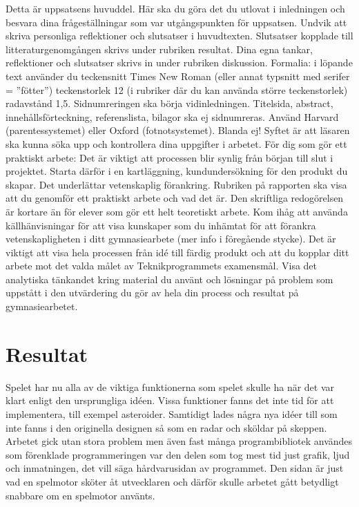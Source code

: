 \documentclass[12pt, a4paper]{article}
\begin{document}
	\begin{small}
		Detta är uppsatsens huvuddel. Här ska du göra det du utlovat i inledningen och
besvara dina frågeställningar som var utgångspunkten för uppsatsen. Undvik
att skriva personliga reflektioner och slutsatser i huvudtexten. Slutsatser
kopplade till litteraturgenomgången skrivs under rubriken resultat. Dina egna
tankar, reflektioner och slutsatser skrivs in under rubriken diskussion.
Formalia: i löpande text använder du teckensnitt Times New Roman (eller
annat typsnitt med serifer = ”fötter”) teckenstorlek 12 (i rubriker där du kan
använda större teckenstorlek) radavstånd 1,5. Sidnumreringen ska börja vidinledningen. Titelsida, abstract, innehållsförteckning, referenslista, bilagor ska
ej sidnumreras. Använd Harvard (parentessystemet) eller Oxford
(fotnotsystemet). Blanda ej! Syftet är att läsaren ska kunna söka upp och
kontrollera dina uppgifter i arbetet.
För dig som gör ett praktiskt arbete:
Det är viktigt att processen blir synlig från början till slut i projektet. Starta
därför i en kartläggning, kundundersökning för den produkt du skapar. Det
underlättar vetenskaplig förankring.
Rubriken på rapporten ska visa att du genomför ett praktiskt arbete och vad
det är. Den skriftliga redogörelsen är kortare än för elever som gör ett helt
teoretiskt arbete. Kom ihåg att använda källhänvisningar för att visa kunskaper
som du inhämtat för att förankra vetenskapligheten i ditt gymnasiearbete (mer
info i föregående stycke). Det är viktigt att visa hela processen från idé till
färdig produkt och att du kopplar ditt arbete mot det valda målet av
Teknikprogrammets examensmål. Visa det analytiska tänkandet kring material
du använt och lösningar på problem som uppstått i den utvärdering du gör av
hela din process och resultat på gymnasiearbetet.
	\end{small}
	
	\newpage
	\section{Resultat}
	
	Spelet har nu alla av de viktiga funktionerna som spelet skulle ha när det var klart enligt den ursprungliga idéen. Vissa funktioner fanns det inte tid för att implementera, till exempel asteroider. Samtidigt lades några nya idéer till som inte fanns i den originella designen så som en radar och sköldar på skeppen. Arbetet gick utan stora problem men även fast många programbibliotek användes som förenklade programmeringen var den delen som tog mest tid just grafik, ljud och inmatningen, det vill säga hårdvarusidan av programmet. Den sidan är just vad en spelmotor sköter åt utvecklaren och därför skulle arbetet gått betydligt snabbare om en spelmotor använts. 
	
\end{document}
